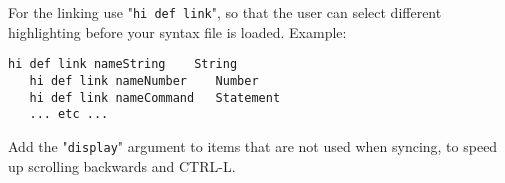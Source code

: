 For the linking use "\verb!hi def link!", so that the user can select different highlighting before your syntax file is loaded.
Example:

\begin{Verbatim}[samepage=true]
   hi def link nameString    String
   hi def link nameNumber    Number
   hi def link nameCommand   Statement
   ... etc ...
\end{Verbatim}

Add the "\verb!display!" argument to items that are not used when syncing, to speed up scrolling backwards and CTRL-L.
\clearpage
